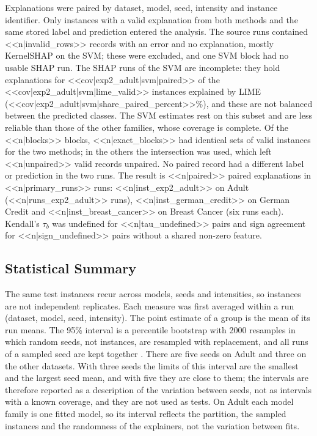\documentclass{cys}
\begin{document}
Explanations were paired by dataset, model, seed, intensity and instance identifier.
Only instances with a valid explanation from both methods and the same stored label and
prediction entered the analysis. The source runs contained <<n|invalid_rows>> records
with an error and no explanation, mostly KernelSHAP on the SVM; these were excluded,
and one SVM block had no usable SHAP run. The SHAP runs of the SVM are incomplete: they
hold explanations for <<cov|exp2_adult|svm|paired>> of the
<<cov|exp2_adult|svm|lime_valid>> instances explained by LIME
(<<cov|exp2_adult|svm|share_paired_percent>>\%), and these are not balanced between the
predicted classes. The SVM estimates rest on this subset and are less reliable than those
of the other families, whose coverage is complete. Of the <<n|blocks>> blocks, <<n|exact_blocks>>
had identical sets of valid instances for the two methods; in the others the
intersection was used, which left <<n|unpaired>> valid records unpaired. No paired
record had a different label or prediction in the two runs. The result is <<n|paired>>
paired explanations in <<n|primary_runs>> runs: <<n|inst_exp2_adult>> on Adult
(<<n|runs_exp2_adult>> runs), <<n|inst_german_credit>> on German Credit and
<<n|inst_breast_cancer>> on Breast Cancer (six runs each). Kendall's $\tau_b$ was
undefined for <<n|tau_undefined>> pairs and sign agreement for <<n|sign_undefined>> pairs
without a shared non-zero feature.

\subsection{Statistical Summary}
\label{sec:methods:stats}

The same test instances recur across models, seeds and intensities, so instances are not
independent replicates. Each measure was first averaged within a run (dataset, model,
seed, intensity). The point estimate of a group is the mean of its run means. The 95\%
interval is a percentile bootstrap with 2000 resamples in which random seeds, not
instances, are resampled with replacement, and all runs of a sampled seed are kept
together \cite{efron1993introduction,cameron2015practitioner}. There are five seeds on
Adult and three on the other datasets. With three seeds the limits of this interval are
the smallest and the largest seed mean, and with five they are close to them; the
intervals are therefore reported as a description of the variation between seeds, not as
intervals with a known coverage, and they are not used as tests. On Adult each model
family is one fitted model, so its interval reflects the partition, the sampled instances
and the randomness of the explainers, not the variation between fits.
\end{document}
